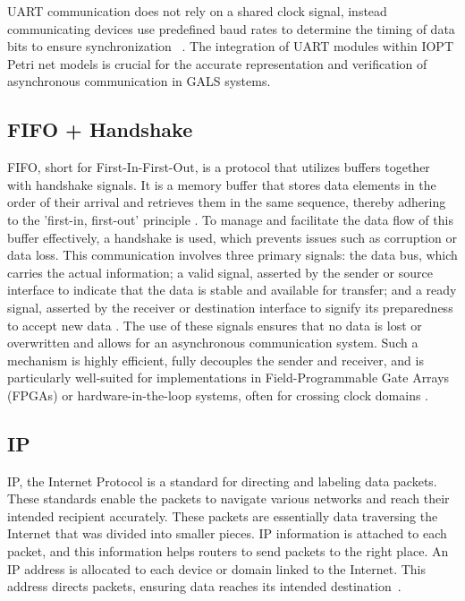 UART communication does not rely on a shared clock signal, instead communicating devices use predefined baud rates to determine the timing of data bits to ensure synchronization ~\cite{UARTard}.  The integration of UART modules within IOPT Petri net models is crucial for the accurate representation and verification of asynchronous communication in GALS systems. 




\subsection{FIFO + Handshake}
\label{sub:fifo+handshake}

FIFO, short for First-In-First-Out, is a protocol that utilizes buffers together with handshake signals. It is a memory buffer that stores data elements in the order of their arrival and retrieves them in the same sequence, thereby adhering to the 'first-in, first-out' principle \cite{wakerly2006}. To manage and facilitate the data flow of this buffer effectively, a handshake is used, which prevents issues such as corruption or data loss. This communication involves three primary signals: the data bus, which carries the actual information; a valid signal, asserted by the sender or source interface to indicate that the data is stable and available for transfer; and a ready signal, asserted by the receiver or destination interface to signify its preparedness to accept new data \cite{arm_axi}. The use of these signals ensures that no data is lost or overwritten and allows for an asynchronous communication system. Such a mechanism is highly efficient, fully decouples the sender and receiver, and is particularly well-suited for implementations in Field-Programmable Gate Arrays (FPGAs) or hardware-in-the-loop systems, often for crossing clock domains \cite{bening2002}. 


\subsection{IP}
\label{sub:ip}

IP, the Internet Protocol is a standard for directing and labeling data packets. These standards enable the packets to navigate various networks and reach their intended recipient accurately. These packets are essentially data traversing the Internet that was divided into smaller pieces. IP information is attached to each packet, and this information helps routers to send packets to the right place. An IP address is allocated to each device or domain linked to the Internet. This address directs packets, ensuring data reaches its intended destination~\cite{ip2024}.

